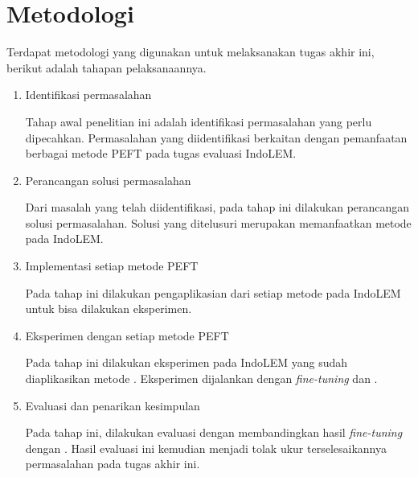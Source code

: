 \section{Metodologi}

Terdapat metodologi yang digunakan untuk melaksanakan tugas akhir ini, berikut adalah tahapan pelaksanaannya.

\begin{enumerate}
    \item Identifikasi permasalahan

    Tahap awal penelitian ini adalah identifikasi permasalahan yang perlu dipecahkan. Permasalahan yang diidentifikasi berkaitan dengan pemanfaatan berbagai metode PEFT pada tugas evaluasi IndoLEM.

    \item Perancangan solusi permasalahan

    Dari masalah yang telah diidentifikasi, pada tahap ini dilakukan perancangan solusi permasalahan. Solusi yang ditelusuri merupakan memanfaatkan metode \PEFT pada IndoLEM.

    \item Implementasi setiap metode PEFT

    Pada tahap ini dilakukan pengaplikasian dari setiap metode \PEFT pada IndoLEM untuk bisa dilakukan eksperimen.

    \item Eksperimen dengan setiap metode PEFT

    Pada tahap ini dilakukan eksperimen pada IndoLEM yang sudah diaplikasikan metode \PEFT. Eksperimen  dijalankan dengan \textit{fine-tuning}  dan \PEFT.

    \item Evaluasi dan penarikan kesimpulan

    Pada tahap ini, dilakukan evaluasi dengan membandingkan hasil \textit{fine-tuning}  dengan \PEFT. Hasil evaluasi ini kemudian  menjadi tolak ukur terselesaikannya permasalahan pada tugas akhir ini.

\end{enumerate}
